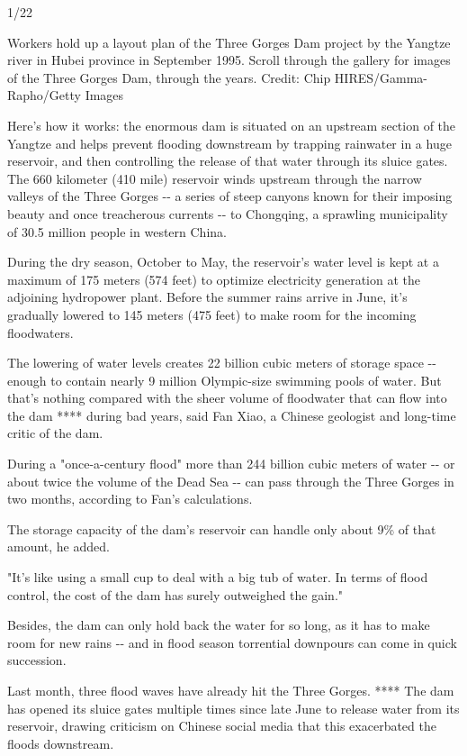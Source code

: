1/22

Workers hold up a layout plan of the Three Gorges Dam project by the
Yangtze river in Hubei province in September 1995. Scroll through the
gallery for images of the Three Gorges Dam, through the years. Credit:
Chip HIRES/Gamma-Rapho/Getty Images

Here's how it works: the enormous dam is situated on an upstream section
of the Yangtze and helps prevent flooding downstream by trapping
rainwater in a huge reservoir, and then controlling the release of that
water through its sluice gates. The 660 kilometer (410 mile) reservoir
winds upstream through the narrow valleys of the Three Gorges -\/- a
series of steep canyons known for their imposing beauty and once
treacherous currents -\/- to Chongqing, a sprawling municipality of 30.5
million people in western China.

During the dry season, October to May, the reservoir's water level is
kept at a maximum of 175 meters (574 feet) to optimize electricity
generation at the adjoining hydropower plant. Before the summer rains
arrive in June, it's gradually lowered to 145 meters (475 feet) to make
room for the incoming floodwaters.

The lowering of water levels creates 22 billion cubic meters of storage
space -\/- enough to contain nearly 9 million Olympic-size swimming
pools of water. But that's nothing compared with the sheer volume of
floodwater that can flow into the dam **** during bad years, said Fan
Xiao, a Chinese geologist and long-time critic of the dam.

During a "once-a-century flood" more than 244 billion cubic meters of
water -\/- or about twice the volume of the Dead Sea -\/- can pass
through the Three Gorges in two months, according to Fan's calculations.

The storage capacity of the dam's reservoir can handle only about 9\% of
that amount, he added.

"It's like using a small cup to deal with a big tub of water. In terms
of flood control, the cost of the dam has surely outweighed the gain."

Besides, the dam can only hold back the water for so long, as it has to
make room for new rains -\/- and in flood season torrential downpours
can come in quick succession.

Last month, three flood waves have already hit the Three Gorges. ****
The dam has opened its sluice gates multiple times since late June to
release water from its reservoir, drawing criticism on Chinese social
media that this exacerbated the floods downstream.

